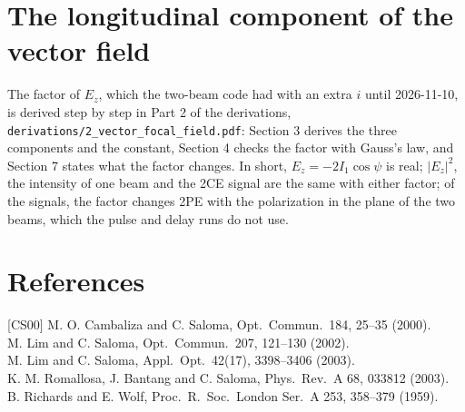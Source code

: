 \documentclass[11pt]{article}
\begin{document}
\section{The longitudinal component of the vector field}
The factor of $E_z$, which the two-beam code had with an extra $i$ until 2026-11-10, is derived step by step in
Part 2 of the derivations, \texttt{derivations/2\_vector\_focal\_field.pdf}: Section 3 derives the three components
and the constant, Section 4 checks the factor with Gauss's law, and Section 7 states what the factor changes. In short,
$E_z = -2I_1\cos\psi$ is real; $|E_z|^2$, the intensity of one beam and the 2CE signal are the same with either factor;
of the signals, the factor changes 2PE with the polarization in the plane of the two beams, which the pulse and delay runs do not use.

\section*{References}
\small
[CS00] M. O. Cambaliza and C. Saloma, Opt.\ Commun.\ 184, 25--35 (2000).\\
\relax[LS02] M. Lim and C. Saloma, Opt.\ Commun.\ 207, 121--130 (2002).\\
\relax[LS03] M. Lim and C. Saloma, Appl.\ Opt.\ 42(17), 3398--3406 (2003).\\
\relax[Rom03] K. M. Romallosa, J. Bantang and C. Saloma, Phys.\ Rev.\ A 68, 033812 (2003).\\
B. Richards and E. Wolf, Proc.\ R.\ Soc.\ London Ser.\ A 253, 358--379 (1959).
\end{document}
